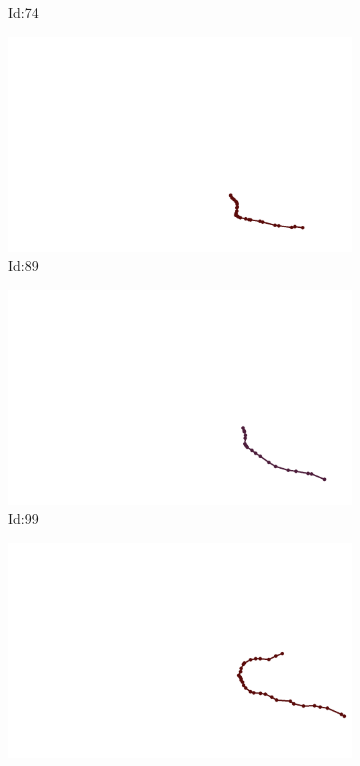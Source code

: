 \documentclass[12pt,twoside]{report}
\begin{document}
\begin{figure}
\begin{subfigure}[b]{0.20\textwidth}
\caption{Id:74}
\end{subfigure}
\begin{subfigure}[b]{0.20\textwidth}
\centering
\includegraphics[width=\textwidth]{../trajectories/89.png}
\caption{Id:89}
\end{subfigure}
\begin{subfigure}[b]{0.20\textwidth}
\centering
\includegraphics[width=\textwidth]{../trajectories/99.png}
\caption{Id:99}
\end{subfigure}
\begin{subfigure}[b]{0.20\textwidth}
\centering
\includegraphics[width=\textwidth]{../trajectories/138.png}

\end{subfigure}
\end{figure}
\end{document}
